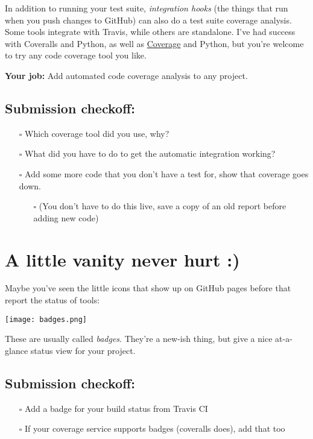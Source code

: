\documentclass{article}
\begin{document}
In addition to running your test suite, \emph{integration hooks} (the things
that run when you push changes to GitHub) can also do a test suite coverage
analysis. Some tools integrate with Travis, while others are standalone. I've
had success with Coveralls and Python, as well as \href{hthttps://pypi.org/project/coverage/}{Coverage} and Python, but you're welcome to try any code
coverage tool you like.

\textbf{Your job:} Add automated code coverage analysis to any project.

\subsection*{Submission checkoff:}
\begin{itemize}
  \item[$\square$] Which coverage tool did you use, why?
  \item[$\square$] What did you have to do to get the automatic integration
    working?
  \item[$\square$] Add some more code that you don't have a test for, show
    that coverage goes down.
    \begin{itemize}
      \item[$\square$] (You don't have to do this live, save a copy of an
        old report before adding new code)
    \end{itemize}
\end{itemize}

\section{A little vanity never hurt :)}

Maybe you've seen the little icons that show up on GitHub pages before that
report the status of tools:

\texttt{[image: badges.png]}

These are usually called \emph{badges}. They're a new-ish thing, but give a
nice at-a-glance status view for your project.

\subsection*{Submission checkoff:}
\begin{itemize}
  \item[$\square$] Add a badge for your build status from Travis CI
  \item[$\square$] If your coverage service supports badges (coveralls does),
    add that too
\end{itemize}
\end{document}
